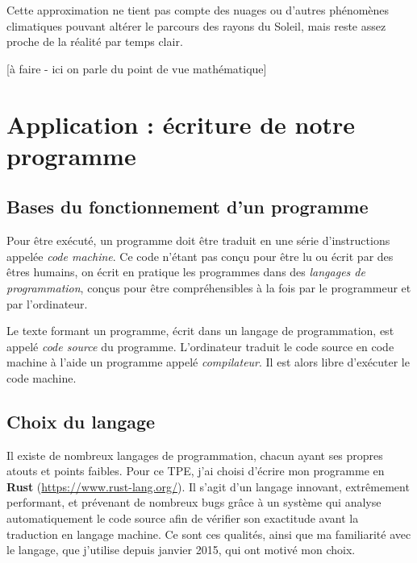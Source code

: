 \documentclass[12pt]{article}
\begin{document}
\begin{center}
\end{center}

Cette approximation ne tient pas compte des nuages ou d'autres phénomènes climatiques pouvant altérer le parcours des rayons du Soleil, mais reste assez proche de la réalité par temps clair.

[à faire - ici on parle du point de vue mathématique]


\clearpage
\section{Application : écriture de notre programme}

\subsection{Bases du fonctionnement d'un programme}

Pour être exécuté, un programme doit être traduit en une série d'instructions appelée \textit{code machine}. Ce code n'étant pas conçu pour être lu ou écrit par des êtres humains, on écrit en pratique les programmes dans des \textit{langages de programmation}, conçus pour être compréhensibles à la fois par le programmeur et par l'ordinateur.

Le texte formant un programme, écrit dans un langage de programmation, est appelé \textit{code source} du programme. L'ordinateur traduit le code source en code machine à l'aide un programme appelé \textit{compilateur}. Il est alors libre d'exécuter le code machine.

\subsection{Choix du langage}
Il existe de nombreux langages de programmation, chacun ayant ses propres atouts et points faibles. Pour ce TPE, j'ai choisi d'écrire mon programme en \textbf{Rust} (\url{https://www.rust-lang.org/}). Il s'agit d'un langage innovant, extrêmement performant, et prévenant de nombreux bugs grâce à un système qui analyse automatiquement le code source afin de vérifier son exactitude avant la traduction en langage machine. Ce sont ces qualités, ainsi que ma familiarité avec le langage, que j'utilise depuis janvier 2015, qui ont motivé mon choix.
\end{document}
